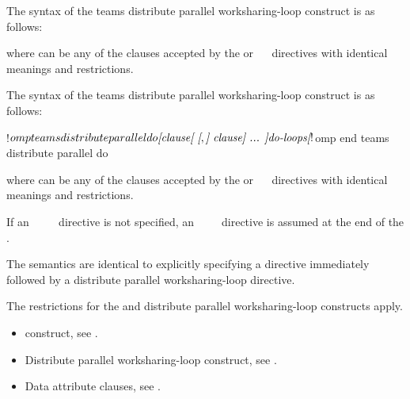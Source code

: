 \syntax
\begin{ccppspecific}
The syntax of the teams distribute parallel worksharing-loop construct is as follows:

\begin{ompcPragma}[fontsize=\small]
#pragma omp teams distribute parallel for \plc{\}
            \plc{[clause[ [},\plc{] clause] ...  ] new-line}
    \plc{for-loops}
\end{ompcPragma}

where  can be any of the clauses accepted by the  or
~~ directives with identical meanings and restrictions.
\end{ccppspecific}

\begin{fortranspecific}
The syntax of the teams distribute parallel worksharing-loop construct is as follows:

\begin{ompfPragma}
!$omp teams distribute parallel do \plc{[clause[ [},\plc{] clause] ... ]}
   \plc{do-loops}
\plc{[} !$omp end teams distribute parallel do \plc{]}
\end{ompfPragma}

where  can be any of the clauses accepted by the  or
~~ directives with identical meanings and restrictions.

If an ~~~~ directive is not specified, an
~ ~~ directive is assumed at the end of the .
\end{fortranspecific}

\descr
The semantics are identical to explicitly specifying a  directive immediately
followed by a distribute parallel worksharing-loop directive.

\restrictions
The restrictions for the  and distribute parallel worksharing-loop constructs apply.

\crossreferences
\begin{itemize}
\item {} construct, see
.

\item Distribute parallel worksharing-loop construct, see
.

\item Data attribute clauses, see
.
\end{itemize}









